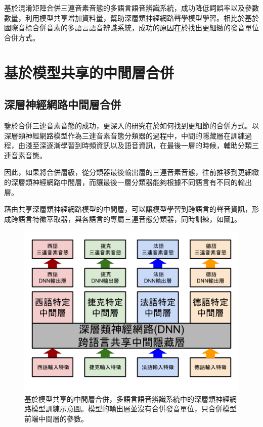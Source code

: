 基於混淆矩陣合併三連音素音態的多語言語音辨識系統，成功降低詞誤率以及參數數量，利用模型共享增加資料量，幫助深層類神經網路聲學模型學習。相比於基於國際音標合併音素的多語言語音辨識系統，成功的原因在於找出更細緻的發音單位合併方式。

\section{基於模型共享的中間層合併}
\subsection{深層神經網路中間層合併}
鑒於合併三連音素音態的成功，更深入的研究在於如何找到更細節的合併方式。以深層類神經網路模型作為三連音素音態分類器的過程中，中間的隱藏層在訓練過程，由淺至深逐漸學習到時頻資訊以及語音資訊，在最後一層的時候，輔助分類三連音素音態。

因此，如果將合併層級，從分類器最後輸出層的三連音素音態，往前推移到更細緻的深層類神經網路中間層，而讓最後一層分類器能夠根據不同語言有不同的輸出層。

藉由共享深層類神經網路模型的中間層，可以讓模型學習到跨語言的聲音資訊，形成跨語言特徵萃取器，與各語言的專屬三連音態分類器，同時訓練，如圖\ref{fig:chap4_dnn_sharing}。
\begin{figure}[!h]
\centering
\includegraphics[scale=0.4]{images/chap4_dnn_sharing.png}
\caption{基於模型共享的中間層合併，多語言語音辨識系統中的深層類神經網路模型訓練示意圖。模型的輸出層並沒有合併發音單位，只合併模型前端中間層的參數。}
\label{fig:chap4_dnn_sharing}
\end{figure}

